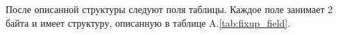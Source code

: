 После описанной структуры следуют поля таблицы. Каждое поле занимает 2 байта и
имеет структуру, описанную в таблице A.\ref{tab:fixup_field}. 


